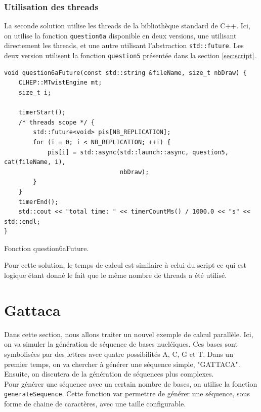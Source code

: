 \documentclass[a4paper]{article}
\begin{document}
\subsubsection{Utilisation des threads}

La seconde solution utilise les threads de la bibliothèque standard de C++. Ici,
on utilise la fonction \texttt{question6a} disponible en deux versions, une
utilisant directement les threads, et une autre utilisant l'abstraction
\texttt{std::future}. Les deux version utilisent la fonction
\texttt{question5} présentée dans la section \ref{sec:script}.

\begin{listing}[ht!]
\begin{verbatim}
void question6aFuture(const std::string &fileName, size_t nbDraw) {
    CLHEP::MTwistEngine mt;
    size_t i;

    timerStart();
    /* threads scope */ {
        std::future<void> pis[NB_REPLICATION];
        for (i = 0; i < NB_REPLICATION; ++i) {
            pis[i] = std::async(std::launch::async, question5, cat(fileName, i),
                                nbDraw);
        }
    }
    timerEnd();
    std::cout << "total time: " << timerCountMs() / 1000.0 << "s" << std::endl;
}
\end{verbatim}
\caption{Fonction question6aFuture.}
\label{fn-q6}
\end{listing}

Pour cette solution, le temps de calcul est similaire à celui du script ce qui
est logique étant donné le fait que le même nombre de threads a été utilisé.

\section{Gattaca}

Dans cette section, nous allons traiter un nouvel exemple de calcul parallèle.
Ici, on va simuler la génération de séquence de bases nucléiques. Ces bases sont
symbolisées par des lettres avec quatre possibilités A, C, G et T. Dans un
premier temps, on va chercher à générer une séquence simple, "GATTACA". Ensuite,
on discutera de la génération de séquences plus complexes.\\

Pour générer une séquence avec un certain nombre de bases, on utilise la
fonction \texttt{generateSequence}. Cette fonction var permettre de générer
une séquence, sous forme de chaine de caractères, avec une taille configurable.
\end{document}
